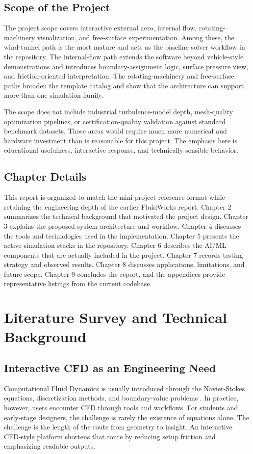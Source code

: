\documentclass[12pt,a4paper,titlepage]{report}
\begin{document}
\section{Scope of the Project}
The project scope covers interactive external aero, internal flow, rotating-machinery visualization, and free-surface experimentation. Among these, the wind-tunnel path is the most mature and acts as the baseline solver workflow in the repository. The internal-flow path extends the software beyond vehicle-style demonstrations and introduces boundary-assignment logic, surface pressure view, and friction-oriented interpretation. The rotating-machinery and free-surface paths broaden the template catalog and show that the architecture can support more than one simulation family.

The scope does not include industrial turbulence-model depth, mesh-quality optimization pipelines, or certification-quality validation against standard benchmark datasets. Those areas would require much more numerical and hardware investment than is reasonable for this project. The emphasis here is educational usefulness, interactive response, and technically sensible behavior.

\section{Chapter Details}
This report is organized to match the mini-project reference format while retaining the engineering depth of the earlier FluidWorks report. Chapter 2 summarizes the technical background that motivated the project design. Chapter 3 explains the proposed system architecture and workflow. Chapter 4 discusses the tools and technologies used in the implementation. Chapter 5 presents the active simulation stacks in the repository. Chapter 6 describes the AI/ML components that are actually included in the project. Chapter 7 records testing strategy and observed results. Chapter 8 discusses applications, limitations, and future scope. Chapter 9 concludes the report, and the appendices provide representative listings from the current codebase.

\chapter{Literature Survey and Technical Background}
\section{Interactive CFD as an Engineering Need}
Computational Fluid Dynamics is usually introduced through the Navier-Stokes equations, discretization methods, and boundary-value problems \cite{anderson,versteeg,ferziger}. In practice, however, users encounter CFD through tools and workflows. For students and early-stage designers, the challenge is rarely the existence of equations alone. The challenge is the length of the route from geometry to insight. An interactive CFD-style platform shortens that route by reducing setup friction and emphasizing readable outputs.
\end{document}
